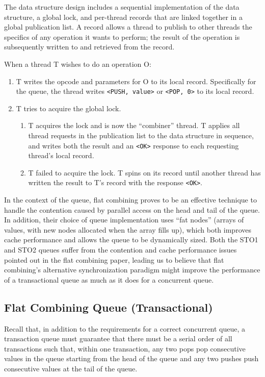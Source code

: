 The data structure design includes a sequential implementation of the data structure, a global lock, and per-thread records that are linked together in a global publication list. A record allows a thread to publish to other threads the specifics of any operation it wants to perform; the result of the operation is subsequently written to and retrieved from the record.

When a thread T wishes to do an operation O:
\begin{enumerate}
    \item T writes the opcode and parameters for O to its local record. Specifically for the queue, the thread writes \texttt{<PUSH, value>} or \texttt{<POP, 0>} to its local record.
   \item T tries to acquire the global lock.
   \begin{enumerate}
        \item T acquires the lock and is now the “combiner” thread. T applies all thread requests in the publication list to the data structure in sequence, and writes both the result and an \texttt{<OK>} response to each requesting thread's local record.
        \item T failed to acquire the lock. T spins on its record until another thread has written the result to T's record with the response \texttt{<OK>}.
    \end{enumerate}
\end{enumerate}

In the context of the queue, flat combining proves to be an effective technique to handle the contention caused by parallel access on the head and tail of the queue. In addition, their choice of queue implementation uses ``fat nodes'' (arrays of values, with new nodes allocated when the array fills up), which both improves cache performance and allows the queue to be dynamically sized. Both the STO1 and STO2 queues suffer from the contention and cache performance issues pointed out in the flat combining paper, leading us to believe that flat combining's alternative synchronization paradigm might improve the performance of a transactional queue as much as it does for a concurrent queue.

\subsection{Flat Combining Queue (Transactional)}
\label{fcqueuet}

Recall that, in addition to the requirements for a correct concurrent queue, a transaction queue must guarantee that there must be a serial order of all transactions such that, within one transaction, any two pops pop consecutive values in the queue starting from the head of the queue and any two pushes push consecutive values at the tail of the queue.

